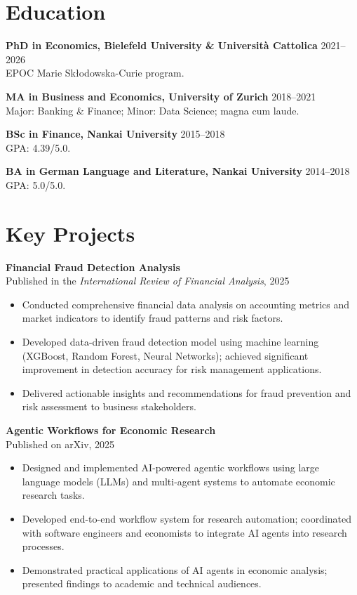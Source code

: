 \documentclass[a4paper,11pt]{article}
\newcommand{\project}[2]{%
  \textbf{#1}\\[-1pt]
  \textcolor{muted}{\small #2}\par
}
\begin{document}
 


\section{Education}
\textbf{PhD in Economics, Bielefeld University \& Universit\`a Cattolica} \hfill 2021--2026\\
EPOC Marie Sk\l odowska-Curie program.

\textbf{MA in Business and Economics, University of Zurich} \hfill 2018--2021\\
Major: Banking \& Finance; Minor: Data Science; magna cum laude.

\textbf{BSc in Finance, Nankai University} \hfill 2015--2018\\
GPA: 4.39/5.0.

\textbf{BA in German Language and Literature, Nankai University} \hfill 2014--2018\\
GPA: 5.0/5.0.

\section{Key Projects}
\project{Financial Fraud Detection Analysis}{Published in the \textit{International Review of Financial Analysis}, 2025}
\begin{itemize}
  \item Conducted comprehensive financial data analysis on accounting metrics and market indicators to identify fraud patterns and risk factors.
  \item Developed data-driven fraud detection model using machine learning (XGBoost, Random Forest, Neural Networks); achieved significant improvement in detection accuracy for risk management applications.
  \item Delivered actionable insights and recommendations for fraud prevention and risk assessment to business stakeholders.
\end{itemize}


\project{Agentic Workflows for Economic Research}{Published on arXiv, 2025}
\begin{itemize}
  \item Designed and implemented AI-powered agentic workflows using large language models (LLMs) and multi-agent systems to automate economic research tasks.
  \item Developed end-to-end workflow system for research automation; coordinated with software engineers and economists to integrate AI agents into research processes.
  \item Demonstrated practical applications of AI agents in economic analysis; presented findings to academic and technical audiences.
\end{itemize}
\end{document}
